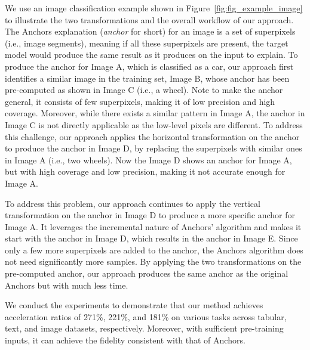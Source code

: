 We use an image classification example shown in Figure~\ref{fig:fig_example_image} to illustrate the two transformations and the overall workflow of our approach.
The Anchors explanation (\emph{anchor} for short) for an image is a set of superpixels (i.e., image segments), meaning if all these superpixels are present, the target model would produce the same result as it produces on the input to explain.
To produce the anchor for Image A, which is classified as a car, our approach first identifies a similar image in the training set, Image B, whose anchor has been pre-computed as shown in Image C (i.e., a wheel).
%
Note to make the anchor general, it consists of few superpixels, making it of low precision and high coverage.
%
Moreover, while there exists a similar pattern in Image A, the anchor in Image C is not directly applicable as the low-level pixels are different.
%
To address this challenge, our approach applies the horizontal transformation on the anchor to produce the anchor in Image D, by replacing the superpixels with similar ones in Image A (i.e., two wheels).
Now the Image D shows an anchor for Image A, but with high coverage and low precision, making it not accurate enough for Image A.

To address this problem, our approach continues to apply the vertical transformation on the anchor in Image D to produce a more specific anchor for Image A. It leverages the incremental nature of Anchors' algorithm and makes it start with the anchor in Image D,
which results in the anchor in Image E.
Since only a few more superpixels are added to the anchor, the Anchors algorithm does not need significantly more samples.
By applying the two transformations on the pre-computed anchor, our approach produces the same anchor as the original Anchors but with much less time.


We conduct the experiments to demonstrate that our method achieves acceleration ratios of 271\%, 221\%, and 181\% on various tasks across tabular, text, and image datasets, respectively. Moreover, with sufficient pre-training inputs, it can achieve the fidelity consistent with that of Anchors.
